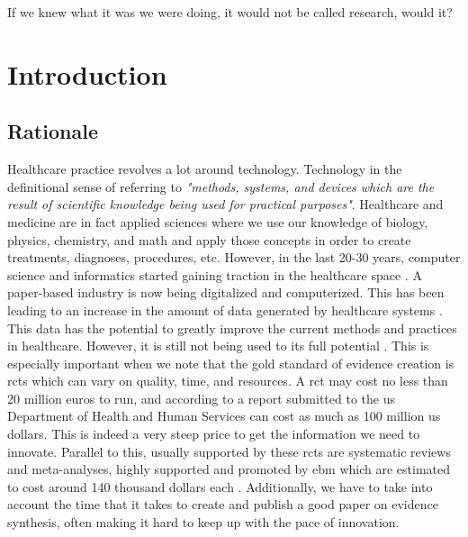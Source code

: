 \begin{savequote}[75mm]
If we knew what it was we were doing, it would not be called research, would it?
\end{savequote}
\chapter{Introduction} \label{chap:intro}


\section{Rationale}
Healthcare practice revolves a lot around technology. Technology in the definitional sense of referring to \textit{"methods, systems, and devices which are the result of scientific knowledge being used for practical purposes"}. Healthcare and medicine are in fact applied sciences where we use our knowledge of biology, physics, chemistry, and math and apply those concepts in order to create treatments, diagnoses, procedures, etc.
However, in the last 20-30 years, computer science and informatics started gaining traction in the healthcare space \cite{adler-milsteinHITECHActDrove2017}. A paper-based industry is now being digitalized and computerized. This has been leading to an increase in the amount of data generated by healthcare systems \cite{kruseUseElectronicHealth2018,palabindalaAdoptionElectronicHealth2016}. 
This data has the potential to greatly improve the current methods and practices in healthcare. However, it is still not being used to its full potential \cite{kruseUseElectronicHealth2018,dicamilloGuestEditorialData2020}. This is especially important when we note that the gold standard of evidence creation is \acp{rct} which can vary on quality, time, and resources. A \ac{rct} may cost no less than 20 million euros to run, and according to a report submitted to the \ac{us} Department of Health and Human Services \cite{sertkayaaylinEXAMINATIONCLINICALTRIAL2014} can cost as much as 100 million \ac{us} dollars. This is indeed a very steep price to get the information we need to innovate. Parallel to this, usually supported by these \acp{rct} are systematic reviews and meta-analyses, highly supported and promoted by \ac{ebm} which are estimated to cost around 140 thousand dollars each \cite{michelsonSignificantCostSystematic2019}. Additionally, we have to take into account the time that it takes to create and publish a good paper on evidence synthesis, often making it hard to keep up with the pace of innovation.

